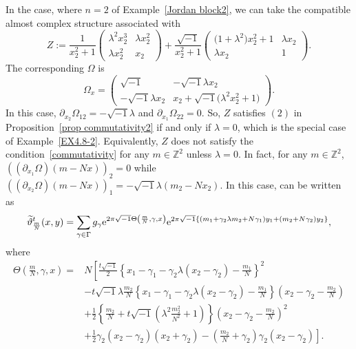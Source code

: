 \documentclass[pdftex]{sigma}
\numberwithin{equation}{section}
\newcommand{\Z}{\mathbb{Z}}
\renewcommand{\tilde}{\widetilde}
\begin{document}
\begin{Example}%
In the case, where $n=2$ of Example~\ref{Jordan block2}, we can take the compatible almost complex structure associated with
\[
Z:=\frac{1}{x_2^2+1}
\begin{pmatrix}
\lambda^2x_2^3 & \lambda x_2^2 \\
\lambda x_2^2 & x_2
\end{pmatrix}
+\dfrac{\sqrt{-1}}{x_2^2+1}
\begin{pmatrix}
\bigl(1+\lambda^2\bigr)x_2^2+1 & \lambda x_2 \\
\lambda x_2 & 1
\end{pmatrix}.
\]
The corresponding $\Omega$ is
\begin{equation*}
\Omega_x=
\begin{pmatrix}
\sqrt{-1} & -\sqrt{-1}\lambda x_2 \\
-\sqrt{-1}\lambda x_2 & x_2+\sqrt{-1}\bigl(\lambda^2x_2^2+1\bigr)
\end{pmatrix}.
\end{equation*}
In this case, $\partial_{x_2}\Omega_{12}=-\sqrt{-1}\lambda$ and $\partial_{x_1}\Omega_{22}=0$. So, $Z$ satisfies $(2)$ in Proposition~\ref{prop commutativity2} if and only if $\lambda=0$, which is the special case of Example~\ref{EX4.8-2}. Equivalently, $Z$
does not satisfy the condition~\eqref{commutativity} for any $m\in \Z^2$ unless $\lambda=0$. In fact, for any $m\in \Z^2$, $((\partial_{x_1}\Omega)(m-Nx))_2=0$ while $((\partial_{x_2}\Omega)(m-Nx))_1=-\sqrt{-1}\lambda (m_2-Nx_2)$. In this case, \smash{${\tilde \vartheta}_{\frac{m}{N}}^t$ }can be written as
\begin{align*}
{\tilde \vartheta}_{\frac{m}{N}}^t(x,y)=\sum_{\gamma \in \Gamma}g_\gamma {\rm e}^{2\pi\sqrt{-1}\Theta\left(\frac{m}{N}, \gamma, x\right)}{\rm e}^{2\pi\sqrt{-1}\left\{(m_1+\gamma_2\lambda m_2+N\gamma_1)y_1+(m_2+N\gamma_2)y_2\right\}},
\end{align*}
where
\begin{align*}
\Theta\left( \frac{m}{N},\gamma ,x\right)={}&
N\left[
\frac{t\sqrt{-1}}{2}\left\{x_1-\gamma_1-\gamma_2\lambda (x_2-\gamma_2)-\frac{m_1}{N}\right\}^2\right.\\
& \left. -t\sqrt{-1}\lambda \frac{m_2}{N}\left\{x_1-\gamma_1-\gamma_2\lambda (x_2-\gamma_2)-\frac{m_1}{N}\right\} \left( x_2-\gamma_2-\frac{m_2}{N}\right)\right.\\
& \left. +\frac{1}{2}\left\{ \frac{m_2}{N}+t\sqrt{-1}\left( \lambda^2\frac{m_2^2}{N^2}+1\right)\right\} \left( x_2-\gamma_2-\frac{m_2}{N}\right)^2\right.\\
&\left.+\frac{1}{2}\gamma_2 (x_2-\gamma_2)(x_2+\gamma_2)-\left(\frac{m_2}{N}+\gamma_2\right) \gamma_2(x_2-\gamma_2)\right].
\end{align*}
\end{Example}
\end{document}
